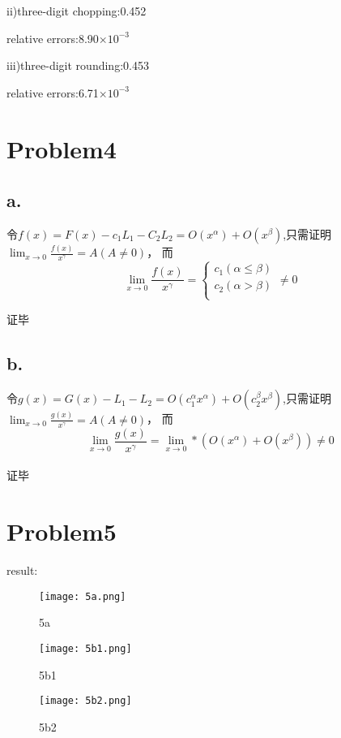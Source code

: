 \documentclass{article}
\begin{document}
ii)three-digit chopping:0.452

relative errors:8.90$\times 10^{-3}$

iii)three-digit rounding:0.453

relative errors:6.71$\times 10^{-3}$




\section{Problem4}
\subsection{a.}
令$f(x)=F(x)-c_1L_1-C_2L_2=O(x^\alpha)+O(x^\beta)$,只需证明$ \lim_{x\to 0} \frac{f(x)}{x^\gamma} =A(A\neq 0)$，
而
$$\lim_{x\to 0} \frac{f(x)}{x^\gamma} =\begin{cases}
    c_1(\alpha\leq\beta)\\
    c_2(\alpha>\beta)\\
    \end{cases}\neq 0$$
    
证毕

\subsection{b.}
令$g(x)=G(x)-L_1-L_2=O(c_1^\alpha x^\alpha)+O(c_2^\beta x^\beta)$,只需证明$ \lim_{x\to 0} \frac{g(x)}{x^\gamma} =A(A\neq 0)$，
而
$$\lim_{x\to 0} \frac{g(x)}{x^\gamma}=\lim_{x\to 0} *(O(x^\alpha)+O(x^\beta))\neq 0$$\\ 

证毕
\section{Problem5}
result:

\begin{figure}[h]
\begin{minipage}[t]{0.3\linewidth}
\centering
\texttt{[image: 5a.png]}
\caption{5a}
\end{minipage}
\begin{minipage}[t]{0.3\linewidth}        %
\hspace{2mm}
\texttt{[image: 5b1.png]}
\caption{5b1}
\end{minipage}
\begin{minipage}[t]{0.3\linewidth}        %
\hspace{2mm}
\texttt{[image: 5b2.png]}
\caption{5b2}
\end{minipage}
\end{figure}
\end{document}
